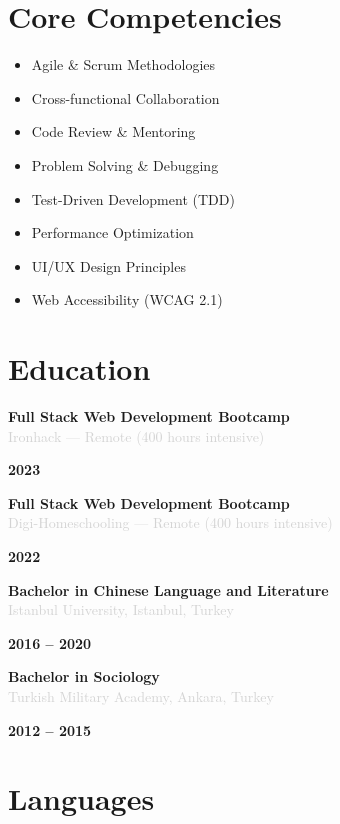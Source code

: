 \documentclass[10pt,a4paper]{article}
\newcommand{\Education}[3]{%
  \vspace{2pt}
  \noindent
  \begin{minipage}[t]{0.70\textwidth}
    {\normalsize\textbf{\color{darkgray}#1}} \\
    \textcolor{lightgray}{\small #2}
  \end{minipage}%
  \hfill
  \begin{minipage}[t]{0.28\textwidth}
    \raggedleft
    \textcolor{mediumgray}{\small\textbf{#3}}
  \end{minipage}
  \vspace{1pt}
}
\begin{document}
\section*{Core Competencies}

\noindent
\begin{minipage}[t]{0.48\textwidth}
  \begin{itemize}
    \item Agile \& Scrum Methodologies
    \item Cross-functional Collaboration
    \item Code Review \& Mentoring
    \item Problem Solving \& Debugging
  \end{itemize}
\end{minipage}%
\hfill
\begin{minipage}[t]{0.48\textwidth}
  \begin{itemize}
    \item Test-Driven Development (TDD)
    \item Performance Optimization
    \item UI/UX Design Principles
    \item Web Accessibility (WCAG 2.1)
  \end{itemize}
\end{minipage}

\section*{Education}

\Education{Full Stack Web Development Bootcamp}{Ironhack — Remote (400 hours intensive)}{2023}

\Education{Full Stack Web Development Bootcamp}{Digi-Homeschooling — Remote (400 hours intensive)}{2022}

\Education{Bachelor in Chinese Language and Literature}{Istanbul University, Istanbul, Turkey}{2016 -- 2020}

\Education{Bachelor in Sociology}{Turkish Military Academy, Ankara, Turkey}{2012 -- 2015}

\section*{Languages}
\end{document}
